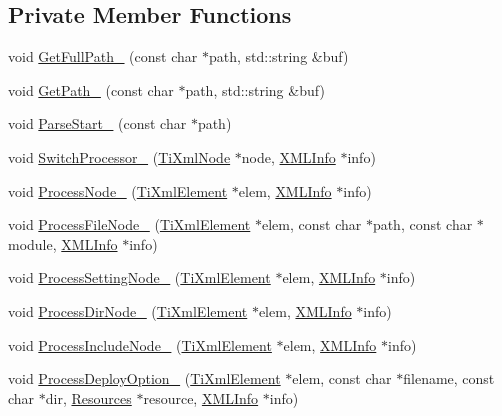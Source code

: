 \subsection*{Private Member Functions}
\begin{DoxyCompactItemize}
\item 
void \hyperlink{classmocha_1_1_x_m_l_reader_a307ace6c6b380e304521e160f989aa37}{GetFullPath\_\-} (const char $\ast$path, std::string \&buf)
\item 
void \hyperlink{classmocha_1_1_x_m_l_reader_a9baa4f350691f766c22985414a5d9fb5}{GetPath\_\-} (const char $\ast$path, std::string \&buf)
\item 
void \hyperlink{classmocha_1_1_x_m_l_reader_a576bac970ec258bed83ea778950b4bbd}{ParseStart\_\-} (const char $\ast$path)
\item 
void \hyperlink{classmocha_1_1_x_m_l_reader_ab92a1a439200a7238834851434806001}{SwitchProcessor\_\-} (\hyperlink{class_ti_xml_node}{TiXmlNode} $\ast$node, \hyperlink{classmocha_1_1_x_m_l_info}{XMLInfo} $\ast$info)
\item 
void \hyperlink{classmocha_1_1_x_m_l_reader_ac6ec29e61af5137a7a5a872099386a0d}{ProcessNode\_\-} (\hyperlink{class_ti_xml_element}{TiXmlElement} $\ast$elem, \hyperlink{classmocha_1_1_x_m_l_info}{XMLInfo} $\ast$info)
\item 
void \hyperlink{classmocha_1_1_x_m_l_reader_afef6eecbd5abb61d067e00ffec509e02}{ProcessFileNode\_\-} (\hyperlink{class_ti_xml_element}{TiXmlElement} $\ast$elem, const char $\ast$path, const char $\ast$module, \hyperlink{classmocha_1_1_x_m_l_info}{XMLInfo} $\ast$info)
\item 
void \hyperlink{classmocha_1_1_x_m_l_reader_a38c7f5600444910749a57af5be1310dc}{ProcessSettingNode\_\-} (\hyperlink{class_ti_xml_element}{TiXmlElement} $\ast$elem, \hyperlink{classmocha_1_1_x_m_l_info}{XMLInfo} $\ast$info)
\item 
void \hyperlink{classmocha_1_1_x_m_l_reader_aa6c7530087864b9855b27f5ccc53946d}{ProcessDirNode\_\-} (\hyperlink{class_ti_xml_element}{TiXmlElement} $\ast$elem, \hyperlink{classmocha_1_1_x_m_l_info}{XMLInfo} $\ast$info)
\item 
void \hyperlink{classmocha_1_1_x_m_l_reader_a4ccf9c3736965dc72b69e8389aee8a95}{ProcessIncludeNode\_\-} (\hyperlink{class_ti_xml_element}{TiXmlElement} $\ast$elem, \hyperlink{classmocha_1_1_x_m_l_info}{XMLInfo} $\ast$info)
\item 
void \hyperlink{classmocha_1_1_x_m_l_reader_a26f425bb1b924b1041294a17ec6f8299}{ProcessDeployOption\_\-} (\hyperlink{class_ti_xml_element}{TiXmlElement} $\ast$elem, const char $\ast$filename, const char $\ast$dir, \hyperlink{classmocha_1_1_resources}{Resources} $\ast$resource, \hyperlink{classmocha_1_1_x_m_l_info}{XMLInfo} $\ast$info)

\end{DoxyCompactItemize}
